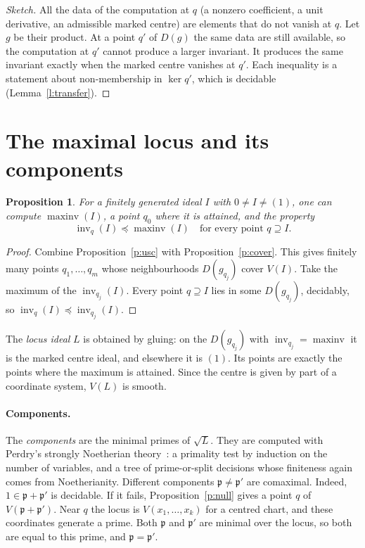 \documentclass[11pt]{article}
\newcommand{\p}{\mathfrak{p}}
\newcommand{\inv}{\operatorname{inv}}
\newcommand{\maxinv}{\operatorname{maxinv}}
\numberwithin{equation}{section}
\theoremstyle{plain}
\newtheorem{proposition}[theorem]{Proposition}
\theoremstyle{definition}
\theoremstyle{remark}
\begin{document}
\begin{proof}[Sketch]
All the data of the computation at $q$ (a nonzero coefficient, a unit derivative, an admissible
marked centre) are elements that do not vanish at $q$. Let $g$ be their product. At a point $q'$ of
$D(g)$ the same data are still available, so the computation at $q'$ cannot produce a larger
invariant. It produces the same invariant exactly when the marked centre vanishes at $q'$. Each
inequality is a statement about non-membership in $\ker q'$, which is decidable
(Lemma~\ref{l:transfer}).
\end{proof}

\section{The maximal locus and its components}\label{s:locus}

\begin{proposition}\label{p:maxinv}
For a finitely generated ideal $I$ with $0\ne I\ne(1)$, one can compute $\maxinv(I)$, a point $q_0$ where it is attained,
and the property
\[
\inv_q(I)\preceq\maxinv(I)\quad\text{for every point }q\supseteq I .
\]
\end{proposition}

\begin{proof}
Combine Proposition~\ref{p:usc} with Proposition~\ref{p:cover}. This gives finitely many points
$q_1,\dots,q_m$ whose neighbourhoods $D(g_{q_j})$ cover $V(I)$. Take the maximum of the
$\inv_{q_j}(I)$. Every point $q\supseteq I$ lies in some $D(g_{q_j})$, decidably, so
$\inv_q(I)\preceq\inv_{q_j}(I)$.
\end{proof}

The \emph{locus ideal} $L$ is obtained by gluing: on the $D(g_{q_j})$ with $\inv_{q_j}=\maxinv$ it is
the marked centre ideal, and elsewhere it is $(1)$. Its points are exactly the points where the
maximum is attained. Since the centre is given by part of a coordinate system, $V(L)$ is smooth.

\paragraph{Components.} The \emph{components} are the minimal primes of $\sqrt L$. They are
computed with Perdry's strongly Noetherian theory~\cite{P}: a primality test by induction on the
number of variables, and a tree of prime-or-split decisions whose finiteness again comes from Noetherianity. Different components $\p\ne\p'$ are comaximal. Indeed, $1\in\p+\p'$ is decidable. If it fails,
Proposition~\ref{p:null} gives a point $q$ of $V(\p+\p')$. Near $q$ the locus is $V(x_1,\dots,x_k)$
for a centred chart, and these coordinates generate a prime. Both $\p$ and $\p'$ are minimal over the
locus, so both are equal to this prime, and $\p=\p'$.
\end{document}
